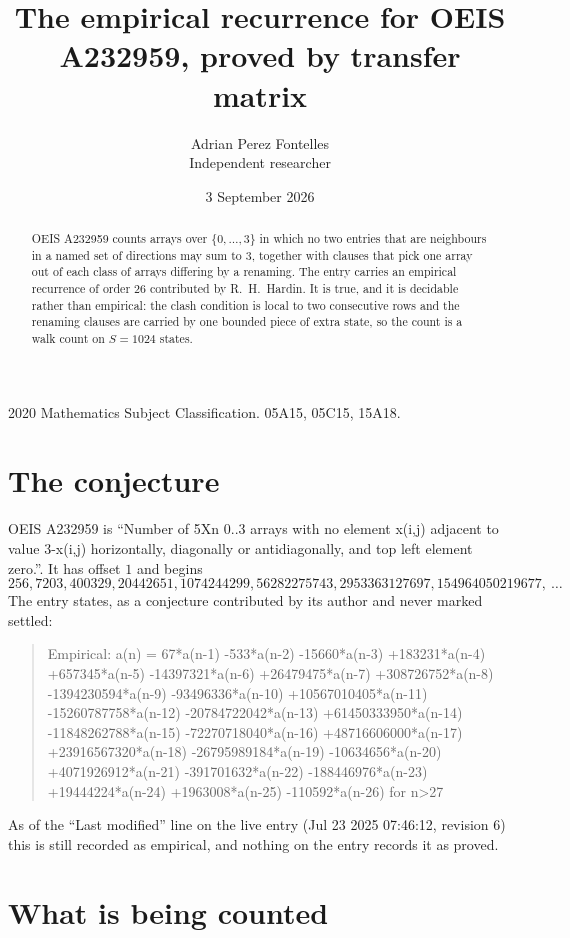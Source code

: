 \documentclass[11pt,a4paper]{article}
\title{The empirical recurrence for OEIS A232959, proved by transfer matrix}
\author{Adrian Perez Fontelles\\ \small Independent researcher}
\date{3 September 2026}
\theoremstyle{plain}
\theoremstyle{definition}
\begin{document}
\maketitle

\begin{abstract}
OEIS A232959 counts arrays over $\{0,\dots,3\}$ in which no two entries that are neighbours in
a named set of directions may sum to $3$, together with clauses that pick one array out of
each class of arrays differing by a renaming. The entry carries an empirical recurrence of
order $26$ contributed by R.~H.~Hardin. It is true, and it is decidable rather than
empirical: the clash condition is local to two consecutive rows and the renaming clauses are
carried by one bounded piece of extra state, so the count is a walk count on $S=1024$ states.
\end{abstract}

\noindent\small 2020 Mathematics Subject Classification. 05A15, 05C15, 15A18.\normalsize

\section{The conjecture}

OEIS A232959 is ``Number of 5Xn 0..3 arrays with no element x(i,j) adjacent to value 3-x(i,j) horizontally, diagonally or antidiagonally, and top left element zero.''. It has offset $1$ and begins
\[
256, 7203, 400329, 20442651, 1074244299, 56282275743, 2953363127697, 154964050219677,\ \dots
\]
The entry states, as a conjecture contributed by its author and never marked settled:
\begin{quote}
Empirical: a(n) = 67*a(n-1) -533*a(n-2) -15660*a(n-3) +183231*a(n-4) +657345*a(n-5) -14397321*a(n-6) +26479475*a(n-7) +308726752*a(n-8) -1394230594*a(n-9) -93496336*a(n-10) +10567010405*a(n-11) -15260787758*a(n-12) -20784722042*a(n-13) +61450333950*a(n-14) -11848262788*a(n-15) -72270718040*a(n-16) +48716606000*a(n-17) +23916567320*a(n-18) -26795989184*a(n-19) -10634656*a(n-20) +4071926912*a(n-21) -391701632*a(n-22) -188446976*a(n-23) +19444224*a(n-24) +1963008*a(n-25) -110592*a(n-26) for n>27
\end{quote}
As of the ``Last modified'' line on the live entry (Jul 23 2025 07:46:12, revision 6) this is still
recorded as empirical, and nothing on the entry records it as proved.

\section{What is being counted}
\end{document}
